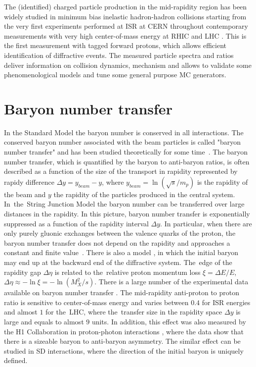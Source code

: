 The (identified) charged particle production in the mid-rapidity region has been widely studied in minimum bias inelastic hadron-hadron collisions starting from the very first experiments performed at ISR at CERN throughout contemporary measurements with very high center-of-mass energy at RHIC \cite{systmeasurhic} and LHC \cite{Adam:2015qaa}. This is the first measurement with tagged forward protons, 
which allows efficient identification of diffractive events. The measured particle spectra and ratios deliver information on collision dynamics, mechanism and allows to validate some phenomenological models and tune some general purpose MC generators.
\section{Baryon number transfer}
In the Standard Model the baryon 
number is conserved in all interactions. The conserved baryon number associated with the beam particles is called "baryon number transfer" and has been studied theoretically for some time~\cite{Kopeliovich:1988qm,Rossi:1977cy,Bopp:2000cr}. The baryon number transfer, which is quantified by the baryon to anti-baryon ratios, is often described as a function of the size of the transport in rapidity represented by
rapidy difference $\Delta y = y_{beam}-y$, where $y_{beam}=\ln\left(\sqrt{s}/m_p\right)$ is the rapidity of the beam and $y$ the rapidity of the particles produced in the central system. In~the~String Junction Model  \cite{Rossi:1977cy} the baryon number can be transferred over large distances in the rapidity. In this picture, baryon number transfer is exponentially suppressed as a function of the rapidity interval $\Delta y$. In particular, when there are only purely gluonic exchanges between the valence quarks of the proton, the baryon number transfer does not depend on the rapidity and approaches a constant and finite value~\cite{Kopeliovich:1988qm}. There is also a model \cite{Bopp:2000cr}, in which the initial baryon may end up at the backward end of the diffractive system. The~edge of the rapidity gap $\Delta\eta$ is related to the~relative proton momentum loss $\xi=\Delta E/E$, $\Delta\eta\approx-\ln\xi=-\ln\left(M_X^2/s\right)$. %
There is a large number of the experimental data available on baryon number transfer \cite{Aamodt:2010dx}. The mid-rapidity  anti-proton to proton ratio is sensitive to center-of-mass energy  and varies between $0.4$ for ISR energies and almost $1$ for the~LHC, where the~transfer size in the rapidity space $\Delta y$ is large and equals to almost $9$ units. In addition, this effect was also measured by the H1 Collaboration in proton-photon interactions \cite{Kopeliovich:1998ps}, where the data show that there is a sizeable baryon to anti-baryon asymmetry. The similar effect can be studied in SD interactions, where the direction of the initial baryon is uniquely defined.


